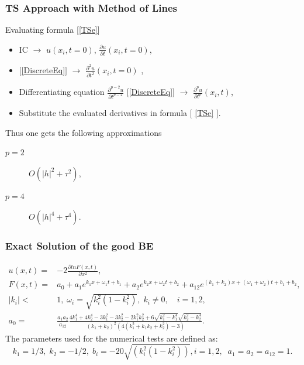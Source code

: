 \documentclass{beamer}
\newcommand{\be}{\begin{equation}}
\newcommand{\ee}{\end{equation}}
\begin{document}

\begin{frame}
\frametitle{TS Approach with Method of Lines}
Evaluating formula [\ref{TSe}]
\begin{itemize}
 \item IC $\rightarrow$ $u(x_i, t=0)$, $\frac{ \partial u }{ \partial t }(x_i,  t=0)$,
 \item $[$\ref{DiscreteEq}$]$ $\rightarrow$ $\frac{ \partial^2 u }{ \partial t^2 }(x_i, t=0)$ ,
 \item Differentiating equation $\frac{ \partial^{p-2} u }{ \partial t^{p-2} }$ [\ref{DiscreteEq}] $\rightarrow$  $\frac{ \partial^p u }{ \partial t^p }(x_i, t)$,
 \item Substitute the evaluated derivatives in formula $[$ \ref{TSe} $]$.
\end{itemize}


Thus one gets the following approximations
\begin{description}
 \item[$p=2$] $O(|h|^2 + \tau^2)$,
 \item[$p=4$] $O(|h|^4 + \tau^4)$.
\end{description}
\end{frame}

\begin{frame}
\frametitle{Exact Solution of the good BE}
\begin{align}\label{orgBsqSol}
u(x,t) =& -2 \frac{\partial ln F(x,t)}{\partial x^2},
\\
 F(x,t) =& a_0 + a_1 e^{k_1 x + \omega_1 t + b_1} + a_2 e^{k_2 x + \omega_2 t + b_2}  + a_{12} e^{(k_1 + k_2) x + (\omega_1 + \omega_2)  t + b_1 + b_2}, \nonumber
\\
|k_i| <& 1, \; \omega_i = \sqrt{k^2_i(1-k^2_i) }, \; k_i \neq 0, \quad i = 1,2, \nonumber
\\
a_0 =& \frac{a_1 a_2}{a_{12}}\frac{4k_1^4 + 4k_2^4 - 3k_1^2 - 3k_2^2 - 2k_1^2 k_2^2 + 6\sqrt{k_1^2-k_1^4}\sqrt{k_2^2-k_2^4} }{(k_1 + k_2)^2 (4(k_1^2 + k_1 k_2 + k_2^2) - 3)}.\nonumber
\end{align}
The parameters used for the numerical tests are defined as:
\be\label{params}
        k_1 = 1/3,  \; k_2 = -1/2,  \; b_i = -20\sqrt{(k_i^ 2  (1 - k_i ^ 2))}, i=1,2,  \;\; a_1 = a_2 = a_{12} = 1.
\ee

\end{frame}
\end{document}
